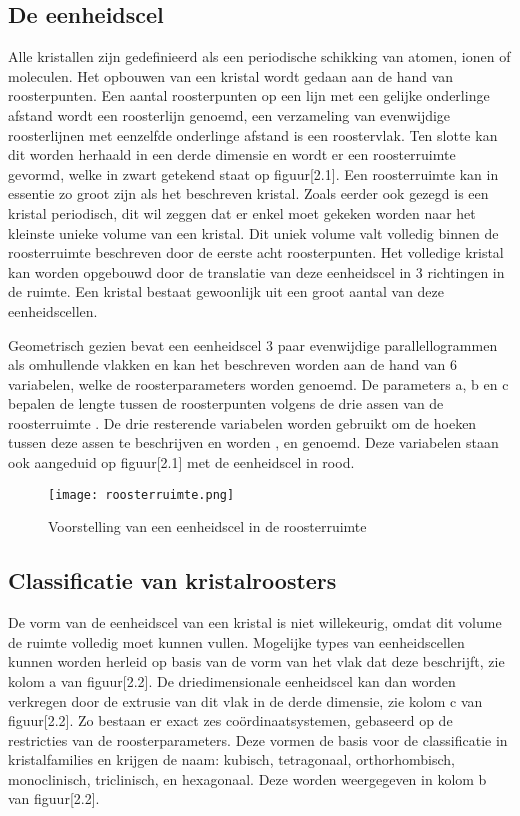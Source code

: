 \subsection{De eenheidscel}
Alle kristallen zijn gedefinieerd als een periodische schikking van atomen, ionen of moleculen. Het opbouwen van een kristal wordt gedaan aan de hand van roosterpunten. Een aantal roosterpunten op een lijn met een gelijke onderlinge afstand wordt een roosterlijn genoemd, een verzameling van evenwijdige roosterlijnen met eenzelfde onderlinge afstand is een roostervlak. Ten slotte kan dit worden herhaald in een derde dimensie en wordt er een roosterruimte gevormd, welke in zwart getekend staat op figuur[2.1]. Een roosterruimte kan in essentie zo groot zijn als het beschreven kristal. Zoals eerder ook gezegd is een kristal periodisch, dit wil zeggen dat er enkel moet gekeken worden naar het kleinste unieke volume van een kristal. Dit uniek volume valt volledig binnen de roosterruimte beschreven door de eerste acht roosterpunten. Het volledige kristal kan worden opgebouwd door de translatie van deze eenheidscel in 3 richtingen in de ruimte. Een kristal bestaat gewoonlijk uit een groot aantal van deze eenheidscellen.
\par
Geometrisch gezien bevat een eenheidscel 3 paar evenwijdige parallellogrammen als omhullende vlakken en kan het beschreven worden aan de hand van 6 variabelen, welke de roosterparameters worden genoemd.  De parameters a, b en c bepalen de lengte tussen de roosterpunten volgens de drie assen van de roosterruimte . De drie resterende  variabelen worden gebruikt om de hoeken tussen deze assen te beschrijven en worden \textalpha, \textbeta{} en \textgamma{} genoemd. Deze variabelen staan ook aangeduid op figuur[2.1] met de eenheidscel in rood. 

\begin{figure}
\texttt{[image: roosterruimte.png]}
\caption{Voorstelling van een eenheidscel in de roosterruimte \citep*{CRYS1}}
\end{figure}

\subsection{Classificatie van kristalroosters}
De vorm van de eenheidscel van een kristal is niet willekeurig, omdat dit volume de ruimte volledig moet kunnen vullen. Mogelijke types van eenheidscellen kunnen worden herleid op basis van de vorm van het vlak dat deze beschrijft, zie kolom a van figuur[2.2]. De driedimensionale eenheidscel kan dan worden verkregen door de extrusie van dit vlak in de derde dimensie, zie kolom c van figuur[2.2]. Zo bestaan er exact zes coördinaatsystemen, gebaseerd op de restricties van de roosterparameters. Deze vormen de basis voor de classificatie in kristalfamilies en krijgen de naam: kubisch, tetragonaal, orthorhombisch, monoclinisch, triclinisch, en hexagonaal. Deze worden weergegeven in kolom b van figuur[2.2]. 


